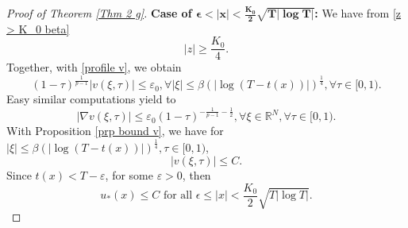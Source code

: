 \documentclass[10pt,a4paper]{amsart}
\newcommand{\R}{\numberset{R}}
\newcommand{\numberset}{\mathbb}
\begin{document}
\begin{proof}[Proof of Theorem \ref{Thm 2 g}]
\textbf{Case of $\mathbf{\epsilon < |x|<\frac{K_0}{2}\sqrt{T|\log T|}}$:} We have from \eqref{z > K_0 beta}
$$|z|\geq \frac{K_0}{4}.$$
Together, with \eqref{profile v}, we obtain \begin{equation*}
(1-\tau)^{\frac{1}{p-1}}|v(\xi,\tau)|\leq \varepsilon_0, \forall |\xi|\leq\beta (|\log(T-t(x))|)^{\frac{1}{4}}, \forall \tau \in [0,1).
\end{equation*}
Easy similar computations yield to 
\begin{equation*}
|\nabla v(\xi,\tau)|\leq \varepsilon_0 (1-\tau)^{-\frac{1}{p-1}-\frac{1}{2}}, \forall \xi\in \R^N, \forall \tau \in [0,1).
\end{equation*}
With Proposition \ref{prp bound v}, we have for $|\xi|\leq\beta (|\log(T-t(x))|)^{\frac{1}{4}},\tau\in[0,1)$, 
$$|v(\xi,\tau)|\leq C.$$
Since $t(x)<T-\varepsilon$, for some $\varepsilon>0$, then 
\begin{equation}\label{control eta x>epsilon}
u_*(x)\leq C \text{ for all }\epsilon\leq |x|<\frac{K_0}{2}\sqrt{T|\log T|}.
\end{equation}


\end{proof}
\end{document}
